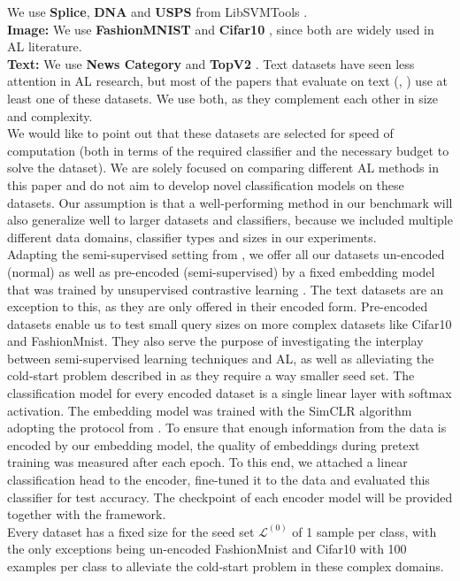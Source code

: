 \documentclass[]{article}
\newcommand{\LL}{\mathcal{L}}
\begin{document}
We use \textbf{Splice}, \textbf{DNA} and \textbf{USPS} from LibSVMTools \cite{libsvmtools}.\\
\textbf{Image:}
We use \textbf{FashionMNIST} \cite{xiao2017fashion} and \textbf{Cifar10} \cite{krizhevsky2009learning}, since both are widely used in AL literature.\\
\textbf{Text:}
We use \textbf{News Category} \cite{misra2022news} and \textbf{TopV2} \cite{chen-etal-2020-low-resource}.
Text datasets have seen less attention in AL research, but most of the papers that evaluate on text (\cite{hu2021towards}, \cite{zhou2021towards}) use at least one of these datasets. 
We use both, as they complement each other in size and complexity. \\ [1mm]
%
We would like to point out that these datasets are selected for speed of computation (both in terms of the required classifier and the necessary budget to solve the dataset). 
We are solely focused on comparing different AL methods in this paper and do not aim to develop novel classification models on these datasets.
Our assumption is that a well-performing method in our benchmark will also generalize well to larger datasets and classifiers, because we included multiple different data domains, classifier types and sizes in our experiments. \\ [1mm]
Adapting the semi-supervised setting from \cite{hacohen2022active}, we offer all our datasets un-encoded (normal) as well as pre-encoded (semi-supervised) by a fixed embedding model that was trained by unsupervised contrastive learning .
The text datasets are an exception to this, as they are only offered in their encoded form.
Pre-encoded datasets enable us to test small query sizes on more complex datasets like Cifar10 and FashionMnist.
They also serve the purpose of investigating the interplay between semi-supervised learning techniques and AL, as well as alleviating the cold-start problem described in \cite{luth2024navigating} as they require a way smaller seed set.
The classification model for every encoded dataset is a single linear layer with softmax activation.
The embedding model was trained with the SimCLR \cite{chen2020simple} algorithm adopting the protocol from \cite{hacohen2022active}. 
To ensure that enough information from the data is encoded by our embedding model, the quality of embeddings during pretext training was measured after each epoch.
To this end, we attached a linear classification head to the encoder, fine-tuned it to the data and evaluated this classifier for test accuracy. 
The checkpoint of each encoder model will be provided together with the framework. \\ [1mm]
Every dataset has a fixed size for the seed set $\LL^{(0)}$ of 1 sample per class, with the only exceptions being un-encoded FashionMnist and Cifar10 with 100 examples per class to alleviate the cold-start problem in these complex domains. 
\end{document}
